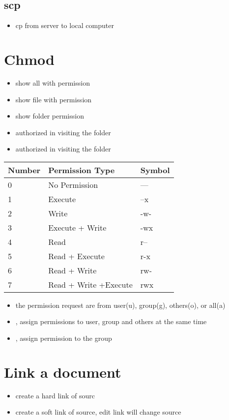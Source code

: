 \subsection{scp}
\begin{itemize}
\item{} cp from server to local computer
\end{itemize}

\section{Chmod}
\begin{itemize}
\item{} show all with permission
\item{} show file with permission
\item{} show folder permission
\item{} authorized in visiting the folder
\item{} authorized in visiting the folder
\end{itemize}

\begin{tabular}{lll}
Number & Permission Type & Symbol\\
\hline
0&No Permission&---\\
1&Execute&--x\\
2&Write&-w-\\
3&Execute + Write&-wx\\
4&Read&r--\\
5&Read + Execute&r-x\\
6&Read + Write&rw-\\
7&Read + Write +Execute&rwx\\
\hline
\end{tabular}

\begin{itemize}
\item the permission request are from user(u), group(g), others(o), or all(a)
\item {}, assign permissions to user, group and others at the same time
\item {}, assign permission to the group
\end{itemize}

\section{Link a document}
\begin{itemize}
\item{} create a hard link of sourc
\item{} create a soft link of source, edit link will change source
\end{itemize}

